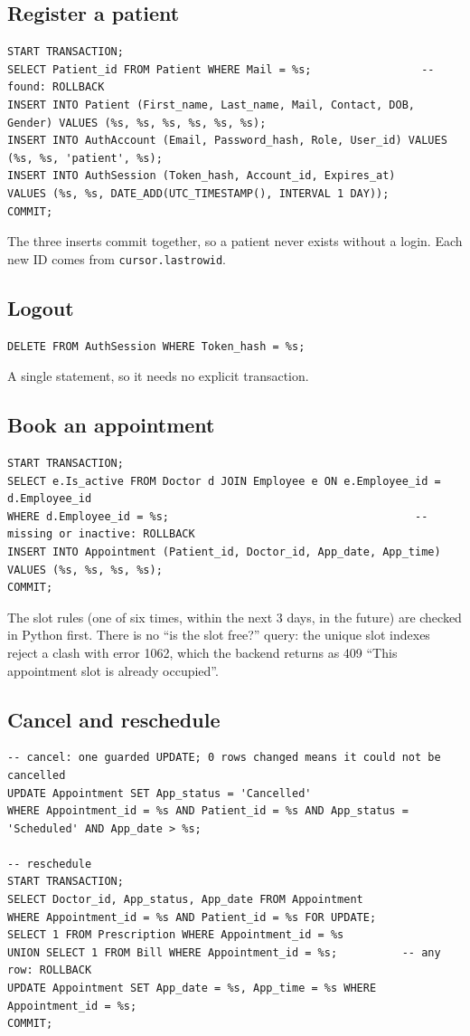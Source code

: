 \documentclass[11pt,a4paper]{article}
\newcommand{\code}[1]{\texttt{#1}}
\begin{document}
\subsection{Register a patient}
\begin{lstlisting}[style=sql]
START TRANSACTION;
SELECT Patient_id FROM Patient WHERE Mail = %s;                 -- found: ROLLBACK
INSERT INTO Patient (First_name, Last_name, Mail, Contact, DOB, Gender) VALUES (%s, %s, %s, %s, %s, %s);
INSERT INTO AuthAccount (Email, Password_hash, Role, User_id) VALUES (%s, %s, 'patient', %s);
INSERT INTO AuthSession (Token_hash, Account_id, Expires_at)
VALUES (%s, %s, DATE_ADD(UTC_TIMESTAMP(), INTERVAL 1 DAY));
COMMIT;
\end{lstlisting}
The three inserts commit together, so a patient never exists without a login. Each new ID comes from \code{cursor.lastrowid}.

\subsection{Logout}
\begin{lstlisting}[style=sql]
DELETE FROM AuthSession WHERE Token_hash = %s;
\end{lstlisting}
A single statement, so it needs no explicit transaction.

\subsection{Book an appointment}
\begin{lstlisting}[style=sql]
START TRANSACTION;
SELECT e.Is_active FROM Doctor d JOIN Employee e ON e.Employee_id = d.Employee_id
WHERE d.Employee_id = %s;                                      -- missing or inactive: ROLLBACK
INSERT INTO Appointment (Patient_id, Doctor_id, App_date, App_time) VALUES (%s, %s, %s, %s);
COMMIT;
\end{lstlisting}
The slot rules (one of six times, within the next 3 days, in the future) are checked in Python first. There is no ``is the slot free?'' query: the unique slot indexes reject a clash with error 1062, which the backend returns as 409 ``This appointment slot is already occupied''.

\subsection{Cancel and reschedule}
\begin{lstlisting}[style=sql]
-- cancel: one guarded UPDATE; 0 rows changed means it could not be cancelled
UPDATE Appointment SET App_status = 'Cancelled'
WHERE Appointment_id = %s AND Patient_id = %s AND App_status = 'Scheduled' AND App_date > %s;

-- reschedule
START TRANSACTION;
SELECT Doctor_id, App_status, App_date FROM Appointment
WHERE Appointment_id = %s AND Patient_id = %s FOR UPDATE;
SELECT 1 FROM Prescription WHERE Appointment_id = %s
UNION SELECT 1 FROM Bill WHERE Appointment_id = %s;          -- any row: ROLLBACK
UPDATE Appointment SET App_date = %s, App_time = %s WHERE Appointment_id = %s;
COMMIT;
\end{lstlisting}
\end{document}
